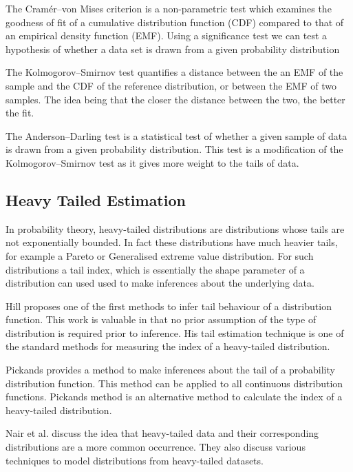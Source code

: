 \documentclass[conference]{IEEEtran}
\begin{document}
The Cram\'er--von Mises criterion \cite{cramer1928composition}\cite{von1928statistik} is a non-parametric test which examines the goodness of fit of a cumulative distribution function (CDF) compared to that of an empirical density function (EMF). Using a significance test we can test a hypothesis of whether a data set is drawn from a given probability distribution

The Kolmogorov--Smirnov \cite{smirnov1948table} test quantifies a distance between the an EMF of the sample and the CDF of the reference distribution, or between the EMF of two samples. The idea being that the closer the distance between the two, the better the fit. 

The Anderson--Darling \cite{anderson1954test}\cite{anderson1952asymptotic} test is a statistical test of whether a given sample of data is drawn from a given probability distribution. This test is a modification of the Kolmogorov--Smirnov test as it gives more weight to the tails of data. 

\subsection{Heavy Tailed Estimation}

In probability theory, heavy-tailed distributions are distributions whose tails are not exponentially bounded. In fact these distributions have much heavier tails, for example a Pareto or Generalised extreme value distribution. For such distributions a tail index, which is essentially the shape parameter of a distribution can used used to make inferences about the underlying data. 

Hill\cite{hill1975simple} proposes one of the first methods to infer tail behaviour of a distribution function. This work is valuable in that no prior assumption of the type of distribution is required prior to inference. His tail estimation technique is one of the standard methods for measuring the index of a heavy-tailed distribution.

Pickands\cite{pickands1975statistical} provides a method to make inferences about the tail of a probability distribution function. This method can be applied to all continuous distribution functions. Pickands method is an alternative method to calculate the index of a heavy-tailed distribution.

Nair et al.\cite{nair2013fundamentals} discuss the idea that heavy-tailed data and their corresponding distributions are a more common occurrence. They also discuss various techniques to model distributions from heavy-tailed datasets.
\end{document}
